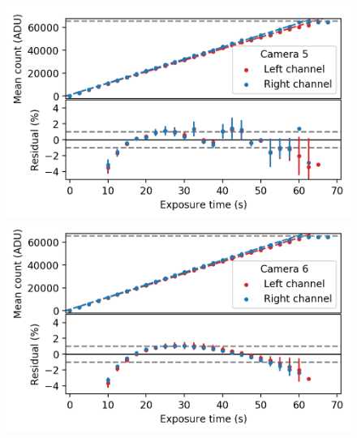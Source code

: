 \begin{colsection}
\begin{colsection}
\begin{figure}[p]
\begin{center}
        \begin{minipage}[t]{0.49\textwidth}\vspace{10pt}
            \includegraphics[width=\linewidth]{images/detectors/lin_5.png}
        \end{minipage}
        \begin{minipage}[t]{0.49\textwidth}\vspace{10pt}
            \includegraphics[width=\linewidth]{images/detectors/lin_6.png}
        \end{minipage}


\end{center}
\end{figure}
\end{colsection}
\end{colsection}
